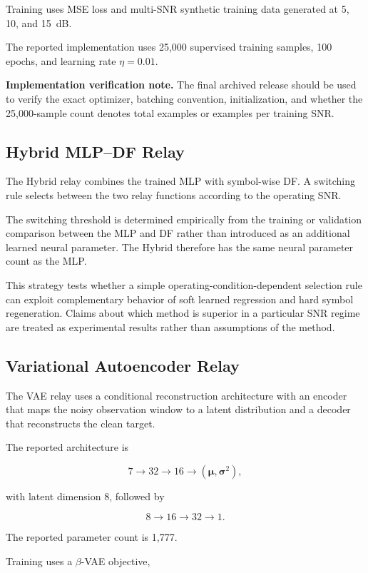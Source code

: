 Training uses MSE loss and multi-SNR synthetic training data generated
at 5, 10, and 15~dB.

The reported implementation uses 25,000 supervised training samples,
100 epochs, and learning rate $\eta=0.01$.

\textbf{Implementation verification note.}
The final archived release should be used to verify the exact optimizer,
batching convention, initialization, and whether the 25,000-sample
count denotes total examples or examples per training SNR.


\subsection{Hybrid MLP--DF Relay}

The Hybrid relay combines the trained MLP with symbol-wise DF. A
switching rule selects between the two relay functions according to
the operating SNR.

The switching threshold is determined empirically from the training or
validation comparison between the MLP and DF rather than introduced as
an additional learned neural parameter. The Hybrid therefore has the
same neural parameter count as the MLP.

This strategy tests whether a simple operating-condition-dependent
selection rule can exploit complementary behavior of soft learned
regression and hard symbol regeneration. Claims about which method is
superior in a particular SNR regime are treated as experimental
results rather than assumptions of the method.


\subsection{Variational Autoencoder Relay}

The VAE relay uses a conditional reconstruction architecture with an
encoder that maps the noisy observation window to a latent
distribution and a decoder that reconstructs the clean target.

The reported architecture is

\[
7
\rightarrow
32
\rightarrow
16
\rightarrow
(\boldsymbol\mu,\boldsymbol\sigma^2),
\]

with latent dimension 8, followed by

\[
8
\rightarrow
16
\rightarrow
32
\rightarrow
1.
\]

The reported parameter count is 1,777.

Training uses a $\beta$-VAE objective,

